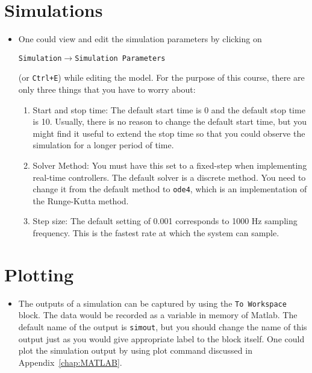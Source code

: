 \section{Simulations}

\begin{itemize}
\item One could view and edit the simulation parameters by clicking on
\begin{center}
\verb|Simulation|$\to$\verb|Simulation Parameters|
\end{center}
(or \verb|Ctrl+E|) while editing the model.  For the purpose of this course,
there are only three things that you have to worry about:
\begin{enumerate}
\item Start and stop time: The default start time is 0 and the default stop
time is 10.  Usually, there is no reason to change the default start time,
but you might find it useful to extend the stop time so that you could
observe the simulation for a longer period of time.

\item Solver Method: You must have this set to a fixed-step when implementing
real-time controllers. The default solver is a discrete method. You need to
change it from the default method to \verb|ode4|, which is an implementation
of the Runge-Kutta method.

\item Step size: The default setting of 0.001 corresponds to 1000 Hz sampling
frequency.  This is the fastest rate at which the system can sample.
\end{enumerate}
\end{itemize}

\section{Plotting}

\begin{itemize}
\item The outputs of a simulation can be captured by using the
\verb|To Workspace| block.  The data would be recorded as a variable in
memory of \textsf{Matlab}.  The default name of the output is \verb|simout|,
but you should change the name of this output just as you would give
appropriate label to the block itself.  One could plot the simulation output
by using plot command discussed in Appendix~\ref{chap:MATLAB}\@.
\end{itemize}

